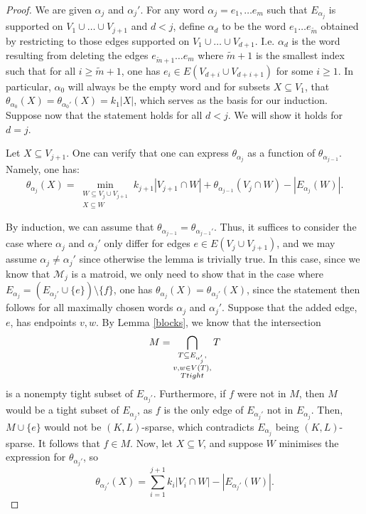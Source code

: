\documentclass[10pt,a4paper]{amsart}
\begin{document}
\begin{proof}
We are given $\alpha_j$ and $\alpha_j'$. For any word $\alpha_j = e_1, \dots e_m$ such that $E_{\alpha_j}$ is supported on $V_1\cup \dots \cup V_{j+1}$ and $d<j$, define $\alpha_{d}$ to be the word $e_1 \dots e_{\tilde{m}}$ obtained by restricting to those edges supported on $V_1\cup \dots \cup V_{d+1}$. I.e. $\alpha_{d}$ is the word resulting from deleting the edges $e_{\tilde{m}+1}\dots e_{m}$ where $\tilde{m}+1$ is the smallest index such that for all $i\geq \tilde{m}+1$, one has $e_{i} \in E(V_{d+i}\cup V_{d+i+1})$ for some $i \geq 1$. In particular, $\alpha_{0}$ will always be the empty word and for subsets $X\subseteq V_1$, that $\theta_{\alpha_0}(X) = \theta_{\alpha_0'}(X) = k_1|X|$, which serves as the basis for our induction. Suppose now that the statement holds for all $d < j$. We will show it holds for $d=j$.

Let $X\subseteq V_{j+1}$. One can verify that one can express $\theta_{\alpha_{j}}$ as a function of $\theta_{\alpha_{j-1}}$. Namely, one has:
\begin{equation*}
    \theta_{\alpha_j}(X)= \min_{\substack{W\subseteq V_{j} \cup V_{j+1}\\[2pt] X\subseteq W}}  k_{j+1}|V_{j+1} \cap W| +\theta_{\alpha_{j-1}}(V_{j}\cap W)  -|E_{\alpha_j}(W)|.
\end{equation*}


By induction, we can assume that $\theta_{\alpha_{j-1}} = \theta_{\alpha_{j-1}'}$. Thus, it suffices to consider the case where $\alpha_{j}$ and $\alpha_{j}'$ only differ for edges $e\in E(V_{j}\cup V_{j+1})$, and we may assume $\alpha_{j}\neq \alpha_{j}'$ since otherwise the lemma is trivially true. In this case, since we know that $\mathcal{M}_{j}$ is a matroid, we only need to show that in the case where $E_{\alpha_{j}} = \left (E_{\alpha_{j}'} \cup \{e\}\right) \setminus \{f\}$, one has $\theta_{\alpha_{j}}(X) = \theta_{\alpha_{j}'}(X)$, since the statement then follows for all maximally chosen words $\alpha_j$ and $\alpha_j'$. Suppose that the added edge, $e$, has endpoints $v,w$. By Lemma \ref{blocks}, we know that the intersection 
\begin{equation*}
M  = \bigcap_{\substack{T\subseteq E_{\alpha_j'},\\ v,w \in V(T),\\ T \textup{ tight }}} T
\end{equation*}
is a nonempty tight subset of $E_{\alpha_j'}$.  Furthermore, if $f$ were not in $M$, then $M$ would be a tight subset of $E_{\alpha_j}$, as $f$ is the only edge of $E_{\alpha_j'}$ not in $E_{\alpha_j}$. Then, $M \cup \{e\}$ would not be $(K,L)$-sparse, which contradicts $E_{\alpha_j}$ being $(K,L)$-sparse. It follows that $f \in M$.  Now, let $X\subseteq V$, and suppose $W$ minimises the expression for $\theta_{\alpha_j'}$, so
\begin{equation*}
\theta_{\alpha_{j}'}(X) = \sum_{i=1}^{j+1} k_i|V_i\cap W| -|E_{\alpha_j'}(W)|.
\end{equation*}


\end{proof}
\end{document}
